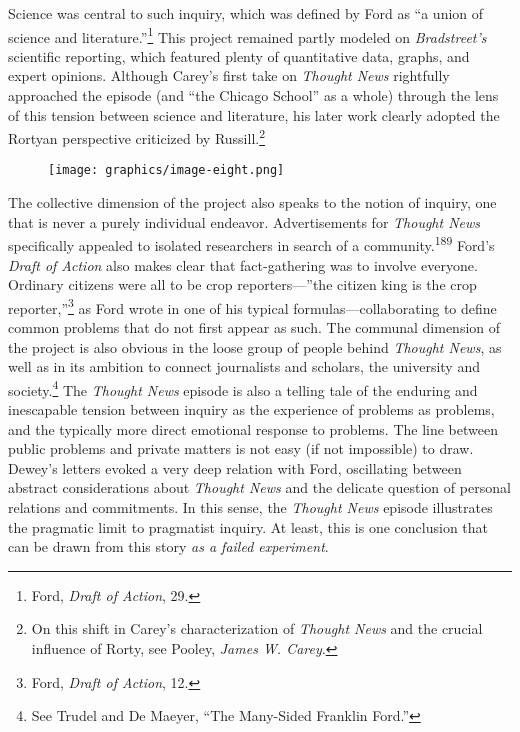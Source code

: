 \documentclass[twoside,symmetric,nobib,justified]{tufte-book}
\begin{document}
Science was central to such inquiry, which was defined by Ford as ``a
union of science and literature.''\footnote{Ford, \emph{Draft of
  Action}, 29.} This project remained partly modeled on
\emph{Bradstreet's} scientific reporting, which featured plenty of
quantitative data, graphs, and expert opinions. Although Carey's first
take on \emph{Thought News} rightfully approached the episode (and ``the
Chicago School'' as a whole) through the lens of this tension between
science and literature, his later work clearly adopted the Rortyan
perspective criticized by Russill.\footnote{On this shift in Carey's
  characterization of \emph{Thought News} and the crucial influence of
  Rorty, see Pooley, \emph{James W. Carey}.}

\begin{figure}
   \texttt{[image: graphics/image-eight.png]}
   \label{fig:fig8}
\end{figure}


The collective dimension of the project also speaks to the notion of
inquiry, one that is never a purely individual endeavor. Advertisements
for \emph{Thought News} specifically appealed to isolated researchers in
search of a community.\textsuperscript{189} Ford's \emph{Draft of Action} also makes clear that
fact-gathering was to involve everyone. Ordinary citizens were all to be
crop reporters---''the citizen king is the crop reporter,''\footnote{Ford,
  \emph{Draft of Action}, 12.} as Ford wrote in one of his typical
formulas---collaborating to define common problems that do not first
appear as such. The communal dimension of the project is also obvious in
the loose group of people behind \emph{Thought News}, as well as in its
ambition to connect journalists and scholars, the university and
society.\footnote{See Trudel and De Maeyer, ``The Many-Sided Franklin
  Ford.''} The \emph{Thought News} episode is also a telling tale of the
enduring and inescapable tension between inquiry as the experience of
problems as problems, and the typically more direct emotional response
to problems. The line between public problems and private matters is not
easy (if not impossible) to draw. Dewey's letters evoked a very deep
relation with Ford, oscillating between abstract considerations about
\emph{Thought News} and the delicate question of personal relations and
commitments. In this sense, the \emph{Thought News} episode illustrates
the pragmatic limit to pragmatist inquiry. At least, this is one
conclusion that can be drawn from this story \emph{as a failed
experiment}.
\end{document}
